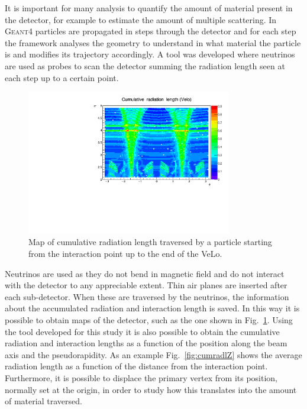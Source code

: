 It is important for many analysis to quantify the amount of material present in the detector, for example to estimate
the amount of multiple scattering. In \textsc{Geant4} particles are propagated in steps
through the detector and for each step the framework analyses the geometry to understand in what material
the particle is and modifies its trajectory accordingly. A tool was developed where neutrinos are
used as probes to scan the detector summing the radiation length seen at each step up to a certain point.
%
\begin{center}
\begin{figure}[h]
\centering \includegraphics[width=0.8\textwidth]{Detector/figs/validation/radlenght/radlgh_prof_ID1.pdf}
\caption{Map of cumulative radiation length traversed by a particle starting from
the interaction point up to the end of the VeLo.}
\label{fig:radlmap}
\end{figure}
%
Neutrinos are used as they do not bend in magnetic field and do not interact with the detector to any appreciable extent.
Thin air planes are inserted after each sub-detector. When these are traversed by the neutrinos, the information
about the accumulated radiation and interaction length is saved. In this way it is possible to obtain maps of
the detector, such as the one shown in Fig.~\ref{fig:radlmap}. Using the tool developed for this study
it is also possible to obtain the cumulative radiation and interaction lengths as a function of the position
along the beam axis and the pseudorapidity. As an example Fig.~\ref{fig:cumradlZ} shows the average
radiation length as a function of the distance from the interaction point. Furthermore, it is possible to displace 
the primary vertex from its position, normally set at the origin, in order to study how this translates 
into the amount of material traversed. 


\end{center}
